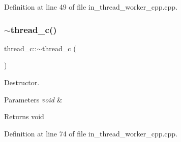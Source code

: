 Definition at line 49 of file in\+\_\+thread\+\_\+worker\+\_\+cpp.\+cpp.

\mbox{\label{group___thread_ga1e1ed1a7891aea3cc30e886ec9651c16}} 
\subsubsection{$\sim$thread\_c()}
{\footnotesize\ttfamily thread\+\_\+c\+::$\sim$thread\+\_\+c (\begin{DoxyParamCaption}\item[{void}]{ }\end{DoxyParamCaption})}



Destructor. 


\begin{DoxyParams}{Parameters}
{\em void} & \\
\hline
\end{DoxyParams}
\begin{DoxyReturn}{Returns}
void 
\end{DoxyReturn}


Definition at line 74 of file in\+\_\+thread\+\_\+worker\+\_\+cpp.\+cpp.


